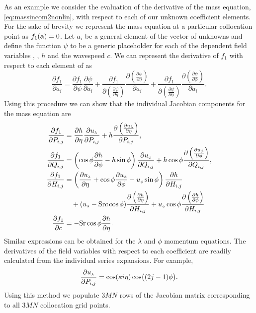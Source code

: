 As an example we consider the evaluation of the derivative of the mass equation, \eqref{eq:massincom2nonlin}, with respect to each of our unknown coefficient elements. For the sake of brevity we represent the mass equation at a particular collocation point as $f_1(\mathbf{a})=0$. Let $a_i$ be a general element of the vector of unknowns  and define the function $\psi$ to be a generic placeholder for each of the dependent field variables \ulam, \uphi, $h$ and the wavespeed $c$. We can represent the derivative of $f_1$ with respect to each element of  as
\begin{equation}
\frac{\partial f_1}{\partial a_i} = \frac{\partial f_1}{\partial \psi} \frac{\partial \psi}{\partial a_i} + \frac{\partial f_1}{\partial \left(\frac{\partial \psi}{\partial \eta} \right)} \frac{\partial \left(\frac{\partial \psi}{\partial \eta} \right)}{\partial a_i}+ \frac{\partial f_1}{\partial \left(\frac{\partial \psi}{\partial \phi} \right)} \frac{\partial \left(\frac{\partial \psi}{\partial \phi} \right)}{\partial a_i}.
\end{equation}
Using this procedure we can show that the individual Jacobian components for the mass equation are
\begin{align}
\frac{\partial f_1}{\partial P_{i,j}}&=\frac{\partial h}{\partial \eta}\frac{\partial {\ensuremath{u_{\scriptscriptstyle \lambda}}}}{\partial P_{i,j}}+h \frac{\partial \left(\frac{\partial {\ensuremath{u_{\scriptscriptstyle \lambda}}}}{\partial \eta} \right)}{\partial P_{i,j}}, \\
\frac{\partial f_1}{\partial Q_{i,j}}&=\left(\cos\phi\frac{\partial h}{\partial \phi}-h\sin\phi \right)\frac{\partial {\ensuremath{u_{\scriptscriptstyle \phi}}}}{\partial Q_{i,j}}+h \cos\phi \frac{\partial \left(\frac{\partial {\ensuremath{u_{\scriptscriptstyle \phi}}}}{\partial \phi} \right)}{\partial Q_{i,j}}, \\
\frac{\partial f_1}{\partial H_{i,j}}&=\left(\frac{\partial {\ensuremath{u_{\scriptscriptstyle \lambda}}}}{\partial \eta}+\cos\phi\frac{\partial {\ensuremath{u_{\scriptscriptstyle \phi}}}}{\partial \phi}-{u_{\scriptscriptstyle \phi}} \sin\phi \right)\frac{\partial h}{\partial H_{i,j}} \notag \\
&\quad+({u_{\scriptscriptstyle \lambda}}-\mathrm{Sr}c\cos\phi)\frac{\partial \left(\frac{\partial h}{\partial \eta} \right)}{\partial H_{i,j}} +{u_{\scriptscriptstyle \phi}} \cos\phi \frac{\partial \left(\frac{\partial h}{\partial \phi} \right)}{\partial H_{i,j}} \\
\frac{\partial f_1}{\partial c}&=-\mathrm{Sr}\cos\phi \frac{\partial h}{\partial \eta}.
\end{align}
Similar expressions can be obtained for the $\lambda$ and $\phi$ momentum equations. The derivatives of the field variables with respect to each coefficient are readily calculated from the individual series expansions. For example,
\begin{equation}
\frac{\partial {\ensuremath{u_{\scriptscriptstyle \lambda}}}}{\partial P_{i,j}} = \cos(\kappa i \eta)\cos\bigl((2j-1)\phi\bigr).
\end{equation} 
Using this method we populate $3MN$ rows of the Jacobian matrix corresponding to all $3MN$ collocation grid points. 

